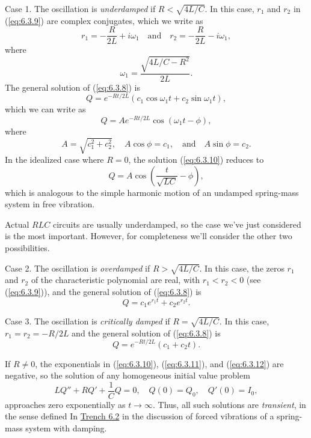 \documentclass{ximera}
\begin{document}
Case 1.
The oscillation is \textit{underdamped} if $R<\sqrt{4L/C}$. In this
case, $r_1$ and $r_2$ in (\ref{eq:6.3.9}) are complex conjugates, which we
write as
$$
r_1=-\frac{R}{2L}+i\omega_1\quad\mbox{and}\quad r_2=-\frac{R}{2L}-i\omega_1,
$$
where
$$
\omega_1=\frac{\sqrt{4L/C-R^2}}{2L}.
$$
The general solution of  (\ref{eq:6.3.8})  is
$$
Q=e^{-Rt/2L}(c_1\cos\omega_1 t+c_2\sin\omega_1 t),
$$
which we can write as
\begin{equation}\label{eq:6.3.10}
Q=Ae^{-Rt/2L}\cos(\omega_1 t-\phi),
\end{equation}
 where
$$
A=\sqrt{c_1^2+c_2^2},\quad A\cos\phi=c_1,\quad\mbox{and}\quad A\sin\phi=c_2.
$$
In the idealized case where $R=0$, the solution (\ref{eq:6.3.10})
reduces to
$$
Q=A\cos\left(\frac{t}{\sqrt{LC}}-\phi\right),
$$
which is analogous to  the simple harmonic motion of an undamped
spring-mass system in free vibration.

Actual $RLC$ circuits are usually underdamped, so the case we've just
considered is the most important. However, for completeness we'll
consider the other two possibilities.

Case 2.
The oscillation is \textit{overdamped} if $R>\sqrt{4L/C}$. In this case,
the zeros $r_1$ and $r_2$ of the characteristic polynomial are real,
with $r_1<r_2<0$ (see (\ref{eq:6.3.9})), and the general solution of
(\ref{eq:6.3.8}) is
\begin{equation}\label{eq:6.3.11}
Q=c_1e^{r_1t}+c_2e^{r_2t}.
\end{equation}

Case 3.
The oscillation is \textit{critically damped} if $R=\sqrt{4L/C}$. In
this case, $r_1=r_2=-R/2L$ and the general solution of (\ref{eq:6.3.8}) is
\begin{equation}\label{eq:6.3.12}
Q=e^{-Rt/2L}(c_1+c_2t).
\end{equation}

If $R\neq 0$, the exponentials in (\ref{eq:6.3.10}), (\ref{eq:6.3.11}),
and
(\ref{eq:6.3.12}) are negative, so the solution of any homogeneous initial
value problem
$$
 LQ''+RQ'+\frac{1}{C}Q=0,\quad Q(0)=Q_0,\quad Q'(0)=I_0,
$$
approaches zero exponentially as $t\rightarrow\infty$. Thus, all such
solutions are \textit{transient}, in the sense defined
In \href{https://ximera.osu.edu/ode/main/springProblemsII/springProblemsII}{Trench 6.2} in the discussion of forced vibrations of a
spring-mass system with damping.
\end{document}
